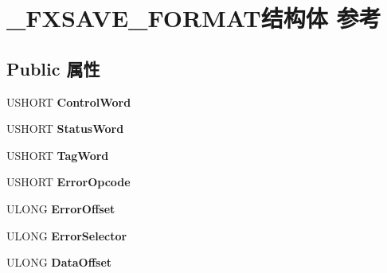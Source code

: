 \hypertarget{struct___f_x_s_a_v_e___f_o_r_m_a_t}{}\section{\+\_\+\+F\+X\+S\+A\+V\+E\+\_\+\+F\+O\+R\+M\+A\+T结构体 参考}
\label{struct___f_x_s_a_v_e___f_o_r_m_a_t}
\subsection*{Public 属性}
\begin{DoxyCompactItemize}
\item 
\mbox{\label{struct___f_x_s_a_v_e___f_o_r_m_a_t_aaa515f948e2b77f67710f84fa2f139c0}} 
U\+S\+H\+O\+RT {\bfseries Control\+Word}
\item 
\mbox{\label{struct___f_x_s_a_v_e___f_o_r_m_a_t_af088823aef44e3f311034ec0786e84da}} 
U\+S\+H\+O\+RT {\bfseries Status\+Word}
\item 
\mbox{\label{struct___f_x_s_a_v_e___f_o_r_m_a_t_abbe78802c31840b5bc4044eec467ac41}} 
U\+S\+H\+O\+RT {\bfseries Tag\+Word}
\item 
\mbox{\label{struct___f_x_s_a_v_e___f_o_r_m_a_t_abd50a6c8363fcc3f94528de3917de222}} 
U\+S\+H\+O\+RT {\bfseries Error\+Opcode}
\item 
\mbox{\label{struct___f_x_s_a_v_e___f_o_r_m_a_t_a6b126e0a2d50b654a000bc68728e74ee}} 
U\+L\+O\+NG {\bfseries Error\+Offset}
\item 
\mbox{\label{struct___f_x_s_a_v_e___f_o_r_m_a_t_afb286fa1ff357b43b9cfd29c76308480}} 
U\+L\+O\+NG {\bfseries Error\+Selector}
\item 
\mbox{\label{struct___f_x_s_a_v_e___f_o_r_m_a_t_ae1799c059c8f624520d2fdc79e1c4713}} 
U\+L\+O\+NG {\bfseries Data\+Offset}
\item 
\mbox{\label{struct___f_x_s_a_v_e___f_o_r_m_a_t_a01aa62fbab81cea112a43ca06ac184f8}} 

\end{DoxyCompactItemize}
